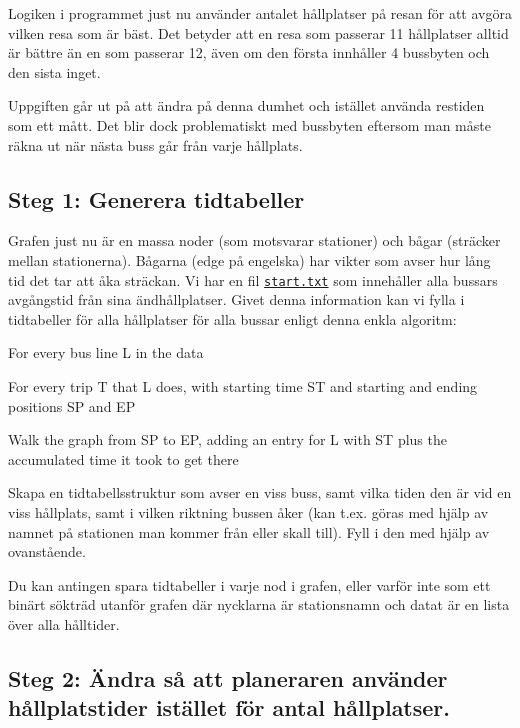 Logiken i programmet just nu använder antalet hållplatser på resan för att avgöra vilken resa som är bäst. Det betyder att en resa som passerar 11 hållplatser alltid är bättre än en som passerar 12, även om den första innhåller 4 bussbyten och den sista inget.

Uppgiften går ut på att ändra på denna dumhet och istället använda restiden som ett mått. Det blir dock problematiskt med bussbyten eftersom man måste räkna ut när nästa buss går från varje hållplats.

\subsection*{Steg 1\+: Generera tidtabeller}

Grafen just nu är en massa noder (som motsvarar stationer) och bågar (sträcker mellan stationerna). Bågarna (edge på engelska) har vikter som avser hur lång tid det tar att åka sträckan. Vi har en fil \href{start.txt}{\tt start.\+txt} som innehåller alla bussars avgångstid från sina ändhållplatser. Givet denna information kan vi fylla i tidtabeller för alla hållplatser för alla bussar enligt denna enkla algoritm\+:


\begin{DoxyItemize}
\item For every bus line L in the data
\begin{DoxyItemize}
\item For every trip T that L does, with starting time S\+T and starting and ending positions S\+P and E\+P
\begin{DoxyItemize}
\item Walk the graph from S\+P to E\+P, adding an entry for L with S\+T plus the accumulated time it took to get there
\end{DoxyItemize}
\end{DoxyItemize}
\end{DoxyItemize}

Skapa en tidtabellsstruktur som avser en viss buss, samt vilka tiden den är vid en viss hållplats, samt i vilken riktning bussen åker (kan t.\+ex. göras med hjälp av namnet på stationen man kommer från eller skall till). Fyll i den med hjälp av ovanstående.

Du kan antingen spara tidtabeller i varje nod i grafen, eller varför inte som ett binärt sökträd utanför grafen där nycklarna är stationsnamn och datat är en lista över alla hålltider.

\subsection*{Steg 2\+: Ändra så att planeraren använder hållplatstider istället för antal hållplatser.}


